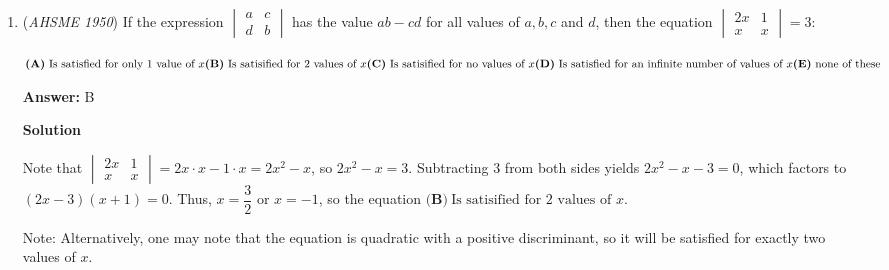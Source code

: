 \begin{enumerate}
 $\textbf{(C)}\ \text{If }x=-1,y\text{ is imaginary (complex)}$. If $x = -1$, then $\log_a -1 = \frac{\ln -1}{\ln a} = \frac{i\pi}{\ln a}$, so this is true.

 $\textbf{(D)}\ \text{If }0<x<1,y\text{ is always less than 0 and decreases without limit as }x\text{ approaches zero}$. Rewriting: $a^y=x$ such that $x<a$. Well, a power of $a$ can be less than $a$ only if $y<1$. And we observe, $y$ has no lower asymptote, because it is perfectly possible to have $y$ be $-100000000$; in fact, the lower $y$ gets, $x$ approaches $0$. This is also correct.

 Since all four of the previous statements are true, the only false statement is $\boxed{\textbf{(E)}\  \text{Only some of the above statements are correct}}$.

 


	\item (\textit{AHSME 1950}) If the expression $\begin{vmatrix}a & c\\ d & b\end{vmatrix}$ has the value $ab-cd$ for all values of $a, b, c$ and $d$, then the equation $\begin{vmatrix}2x & 1\\ x & x\end{vmatrix}= 3$:


 $\textbf{(A)}\ \text{Is satisfied for only 1 value of }x\qquad\\ \textbf{(B)}\ \text{Is satisified for 2 values of }x\qquad\\ \textbf{(C)}\ \text{Is satisified for no values of }x\qquad\\ \textbf{(D)}\ \text{Is satisfied for an infinite number of values of }x\qquad\\ \textbf{(E)}\ \text{none of these}$

 \textbf{Answer: }B



\textbf{Solution}

Note that $\begin{vmatrix}2x & 1\\ x & x\end{vmatrix}=2x \cdot x - 1 \cdot x = 2x^2-x$, so $2x^2 - x=3$. Subtracting $3$ from both sides yields $2x^2-x-3=0$, which factors to $(2x-3)(x+1)=0$. Thus, $x=\dfrac{3}{2}$ or $x = -1$, so the equation $\boxed{\textbf{(B)}\ \text{Is satisified for 2 values of }x}$.

 Note: Alternatively, one may note that the equation is quadratic with a positive discriminant, so it will be satisfied for exactly two values of $x$.


\end{enumerate}

